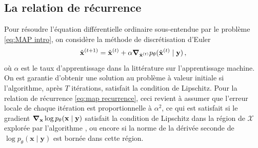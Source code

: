\subsection{La relation de récurrence}
Pour résoudre l'équation différentielle ordinaire sous-entendue par le problème \eqref{eq:MAP intro}, 
on considère la méthode de discrétisation d'Euler 
\begin{equation}\label{eq:map recurrence}
        \hat{\mathbf{x}}^{(t+1)} = \hat{\mathbf{x}}^{(t)} + \alpha \grad_{\hat{\mathbf{x}}^{(t)}} p_\theta(\hat{\mathbf{x}}^{(t)} \mid \mathbf{y})\, ,
\end{equation} 
où $\alpha$ est le taux d'apprentissage dans la littérature sur 
l'apprentissage machine.
On est garantie d'obtenir une solution 
au problème à valeur initiale si l'algorithme, après $T$ itérations, 
satisfait la condition de Lipschitz. Pour la relation de récurrence \eqref{eq:map recurrence}, ceci revient 
à assumer que l'erreur locale de chaque itération est proportionnelle à $\alpha^{2}$, ce qui est 
satisfait si le gradient $\grad_{\mathbf{x}}\log p_\theta(\mathbf{x} \mid \mathbf{y})$ 
satisfait la condition de Lipschitz dans la région de $\mathcal{X}$ explorée par l'algorithme \citep{Atkinson1989,Butcher2016}, 
ou encore si la norme de la dérivée seconde de $\log p_\theta(\mathbf{x} \mid \mathbf{y})$ est bornée dans cette région.

